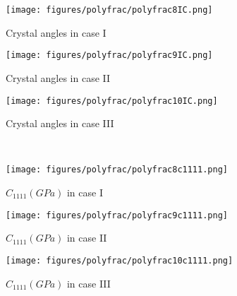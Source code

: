 \documentclass[3p,10pt,sort&compress]{elsarticle}
\begin{document}
\begin{figure*}[!htb]
	\centering
  \begin{subfigure}{0.32\textwidth}
		\texttt{[image: figures/polyfrac/polyfrac8IC.png]}
		\caption{Crystal angles in case I}
	  \label{fig:theta0poly1}
	\end{subfigure}
	\begin{subfigure}{0.32\textwidth}
    \texttt{[image: figures/polyfrac/polyfrac9IC.png]}
		\caption{Crystal angles in case II}
	  \label{fig:theta0poly2}
	\end{subfigure}
	\begin{subfigure}{0.32\textwidth}
    \texttt{[image: figures/polyfrac/polyfrac10IC.png]}
		\caption{Crystal angles in case III}
	  \label{fig:theta0poly3}
	\end{subfigure}
  \\
  \begin{subfigure}{0.32\textwidth}
    \texttt{[image: figures/polyfrac/polyfrac8c1111.png]}
    \caption{$C_{1111}(GPa)$ in case I}
    \label{fig:c11case1}
  \end{subfigure}
  \begin{subfigure}{0.32\textwidth}
    \texttt{[image: figures/polyfrac/polyfrac9c1111.png]}
    \caption{$C_{1111}(GPa)$ in case II}
    \label{fig:c11case2}
  \end{subfigure}
  \begin{subfigure}{0.32\textwidth}
    \texttt{[image: figures/polyfrac/polyfrac10c1111.png]}
    \caption{$C_{1111}(GPa)$ in case III}
    \label{fig:c11case3}
  \end{subfigure}
	\caption{Three different cases considered in the polycrystal fracture simulations with the initial crack: Crystal orientations performed on the elasticity tensor and reference angles performed on anisotropic fracture energy(set the same as crystal orientations) are shown in Figs. \ref{fig:theta0poly1}-\ref{fig:theta0poly3}; The resultant $C_{1111}$(GPa) after rotations are shown in Figs. \ref{fig:c11case1}-\ref{fig:c11case3}, respectively.}
  \label{fig:polyfracIC}
\end{figure*}
\end{document}
